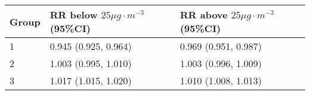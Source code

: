 \begin{tabular}{lll}
  \hline
Group & RR below $25 \mu g \cdot m^{-3}$ (95\%CI) & RR above $25 \mu g \cdot m^{-3}$ (95\%CI) \\ 
  \hline
   1 & 0.945 (0.925, 0.964) & 0.969 (0.951, 0.987) \\ 
     2 & 1.003 (0.995, 1.010) & 1.003 (0.996, 1.009) \\ 
     3 & 1.017 (1.015, 1.020) & 1.010 (1.008, 1.013) \\ 
   \hline
\end{tabular}

